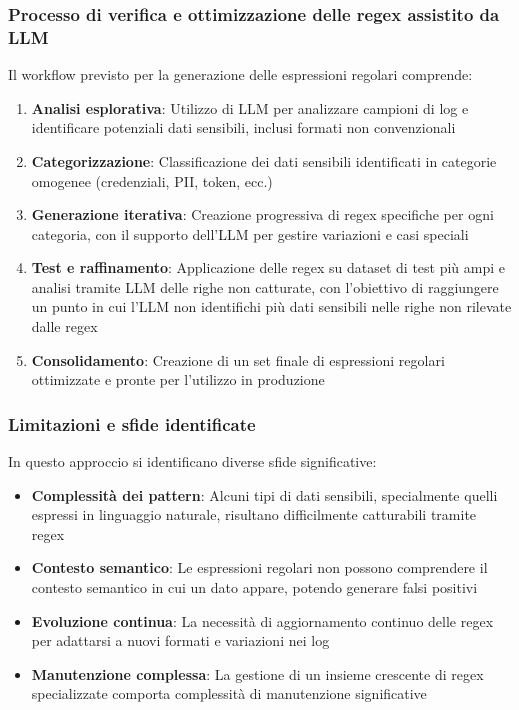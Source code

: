 \documentclass[12pt]{report}
\begin{document}
\subsubsection{Processo di verifica e ottimizzazione delle regex assistito da LLM}
Il workflow previsto per la generazione delle espressioni regolari comprende:

\begin{enumerate}
    \item \textbf{Analisi esplorativa}: Utilizzo di LLM per analizzare campioni di log e identificare potenziali dati sensibili, inclusi formati non convenzionali
    \item \textbf{Categorizzazione}: Classificazione dei dati sensibili identificati in categorie omogenee (credenziali, PII, token, ecc.)
    \item \textbf{Generazione iterativa}: Creazione progressiva di regex specifiche per ogni categoria, con il supporto dell'LLM per gestire variazioni e casi speciali
    \item \textbf{Test e raffinamento}: Applicazione delle regex su dataset di test più ampi e analisi tramite LLM delle righe non catturate, con l'obiettivo di raggiungere un punto in cui l'LLM non identifichi più dati sensibili nelle righe non rilevate dalle regex
    \item \textbf{Consolidamento}: Creazione di un set finale di espressioni regolari ottimizzate e pronte per l'utilizzo in produzione
\end{enumerate}

\subsubsection{Limitazioni e sfide identificate}
In questo approccio si identificano diverse sfide significative:

\begin{itemize}
    \item \textbf{Complessità dei pattern}: Alcuni tipi di dati sensibili, specialmente quelli espressi in linguaggio naturale, risultano difficilmente catturabili tramite regex
    \item \textbf{Contesto semantico}: Le espressioni regolari non possono comprendere il contesto semantico in cui un dato appare, potendo generare falsi positivi
    \item \textbf{Evoluzione continua}: La necessità di aggiornamento continuo delle regex per adattarsi a nuovi formati e variazioni nei log
    \item \textbf{Manutenzione complessa}: La gestione di un insieme crescente di regex specializzate comporta complessità di manutenzione significative
\end{itemize}
\end{document}
